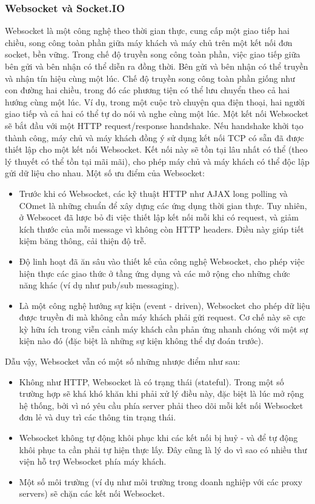 \subsubsection{Websocket và Socket.IO}
Websocket là một công nghệ theo thời gian thực, cung cấp một giao tiếp hai chiều, song công toàn phần giữa máy khách và máy chủ trên một kết nối đơn socket, bền vững. Trong chế độ truyền song công toàn phần, việc giao tiếp giữa bên gửi và bên nhận có thể diễn ra đồng thời. Bên gửi và bên nhận có thể truyền và nhận tín hiệu cùng một lúc. Chế độ truyền song công toàn phần giống như con đường hai chiều, trong đó các phương tiện có thể lưu chuyển theo cả hai hướng cùng một lúc. Ví dụ, trong một cuộc trò chuyện qua điện thoại, hai người giao tiếp và cả hai có thể tự do nói và nghe cùng một lúc. Một kết nối Websocket sẽ bắt đầu với một HTTP request/response handshake. Nếu handshake khởi tạo thành công, máy chủ và máy khách đồng ý sử dụng kết nối TCP có sẵn đã được thiết lập cho một kết nối Websocket. Kết nối này sẽ tồn tại lâu nhất có thể (theo lý thuyết có thể tồn tại mãi mãi), cho phép máy chủ và máy khách có thể độc lập gửi dữ liệu cho nhau. Một số ưu điểm của Websocket:
\begin{itemize}
    \item Trước khi có Websocket, các kỹ thuật HTTP như AJAX long polling và COmet là những chuẩn để xây dựng các ứng dụng thời gian thực. Tuy nhiên, ở Websocet đã lược bỏ đi việc thiết lập kết nối mỗi khi có request, và giảm kích thước của mỗi message vì không còn HTTP headers. Điều này giúp tiết kiệm băng thông, cải thiện độ trễ.
    \item Độ linh hoạt đã ăn sâu vào thiết kế của công nghệ Websocket, cho phép việc hiện thực các giao thức ở tầng ứng dụng và các mở rộng cho những chức năng khác (ví dụ như pub/sub messaging).
    \item Là một công nghệ hướng sự kiện (event - driven), Websocket cho phép dữ liệu được truyền đi mà không cần máy khách phải gửi request. Cơ chế này sẽ cực kỳ hữu ích trong viễn cảnh máy khách cần phản ứng nhanh chóng với một sự kiện nào đó (đặc biệt là những sự kiện không thể dự đoán trước).
\end{itemize}
Dẫu vậy, Websocket vẫn có một số những nhược điểm như sau:
\begin{itemize}
    \item Không như HTTP, Websocket là có trạng thái (stateful). Trong một số trường hợp sẽ khá khó khăn khi phải xử lý điều này, đặc biệt là lúc mở rộng hệ thống, bởi vì nó yêu cầu phía server phải theo dõi mỗi kết nối Websocket đơn lẻ và duy trì các thông tin trạng thái.
    \item Websocket không tự động khôi phục khi các kết nối bị huỷ - và để tự động khôi phục ta cần phải tự hiện thực lấy. Đây cũng là lý do vì sao có nhiều thư viện hỗ trợ Websocket phía máy khách.
    \item Một số môi trường (ví dụ như môi trường trong doanh nghiệp với các proxy servers) sẽ chặn các kết nối Websocket.
\end{itemize}
